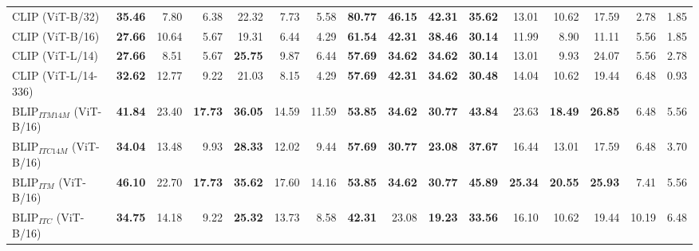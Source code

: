 \begin{table*}[!ht]
\begin{adjustbox}{max width=\textwidth}
\begin{tabular}{l|rrr|rrr|rrr|rrr|rrr}
 CLIP (ViT-B/32)                     & \textbf{35.46} & 7.80           & 6.38           & 22.32          & 7.73           & 5.58           & \textbf{80.77} & \textbf{46.15} & \textbf{42.31} & \textbf{35.62} & 13.01          & 10.62          & 17.59          & 2.78           & 1.85           \\
 CLIP (ViT-B/16)                     & \textbf{27.66} & 10.64          & 5.67           & 19.31          & 6.44           & 4.29           & \textbf{61.54} & \textbf{42.31} & \textbf{38.46} & \textbf{30.14} & 11.99          & 8.90           & 11.11          & 5.56           & 1.85           \\
 CLIP (ViT-L/14)                     & \textbf{27.66} & 8.51           & 5.67           & \textbf{25.75} & 9.87           & 6.44           & \textbf{57.69} & \textbf{34.62} & \textbf{34.62} & \textbf{30.14} & 13.01          & 9.93           & 24.07          & 5.56           & 2.78           \\
 CLIP (ViT-L/14-336)                 & \textbf{32.62} & 12.77          & 9.22           & 21.03          & 8.15           & 4.29           & \textbf{57.69} & \textbf{42.31} & \textbf{34.62} & \textbf{30.48} & 14.04          & 10.62          & 19.44          & 6.48           & 0.93           \\
 BLIP$_{ITM 14M}$ (ViT-B/16)         & \textbf{41.84} & 23.40          & \textbf{17.73} & \textbf{36.05} & 14.59          & 11.59          & \textbf{53.85} & \textbf{34.62} & \textbf{30.77} & \textbf{43.84} & 23.63          & \textbf{18.49} & \textbf{26.85} & 6.48           & 5.56           \\
 BLIP$_{ITC 14M}$ (ViT-B/16)         & \textbf{34.04} & 13.48          & 9.93           & \textbf{28.33} & 12.02          & 9.44           & \textbf{57.69} & \textbf{30.77} & \textbf{23.08} & \textbf{37.67} & 16.44          & 13.01          & 17.59          & 6.48           & 3.70           \\
 BLIP$_{ITM}$ (ViT-B/16)             & \textbf{46.10} & 22.70          & \textbf{17.73} & \textbf{35.62} & 17.60          & 14.16          & \textbf{53.85} & \textbf{34.62} & \textbf{30.77} & \textbf{45.89} & \textbf{25.34} & \textbf{20.55} & \textbf{25.93} & 7.41           & 5.56           \\
 BLIP$_{ITC}$ (ViT-B/16)             & \textbf{34.75} & 14.18          & 9.22           & \textbf{25.32} & 13.73          & 8.58           & \textbf{42.31} & 23.08          & \textbf{19.23} & \textbf{33.56} & 16.10          & 10.62          & 19.44          & 10.19          & 6.48           \\

\end{tabular}
\end{adjustbox}
\end{table*}
